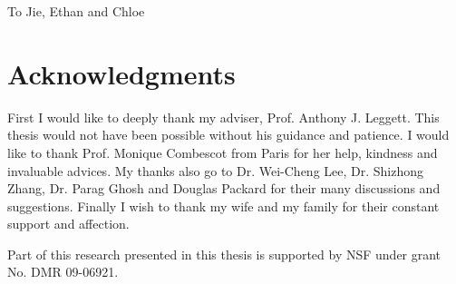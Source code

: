 \documentclass[edeposit,fullpage,prequest,10pt]{uiucthesis2009}
\begin{document}
\begin{dedication}
To Jie, Ethan and Chloe
\end{dedication}

\chapter*{Acknowledgments}
First I would like to deeply thank my adviser, Prof. Anthony J. Leggett.  This thesis would not have been possible without his guidance and patience.  I would like to thank Prof. Monique Combescot from Paris for her help, kindness and  invaluable advices.  My thanks also go to  Dr. Wei-Cheng Lee, Dr. Shizhong Zhang, Dr. Parag Ghosh and   Douglas
Packard  for their many discussions and suggestions.  Finally I wish to  thank my wife and my family for their constant support and affection.  

Part of this research presented in  this thesis  is supported  by NSF under grant No. DMR 09-06921. 


\tableofcontents

%

\end{document}
